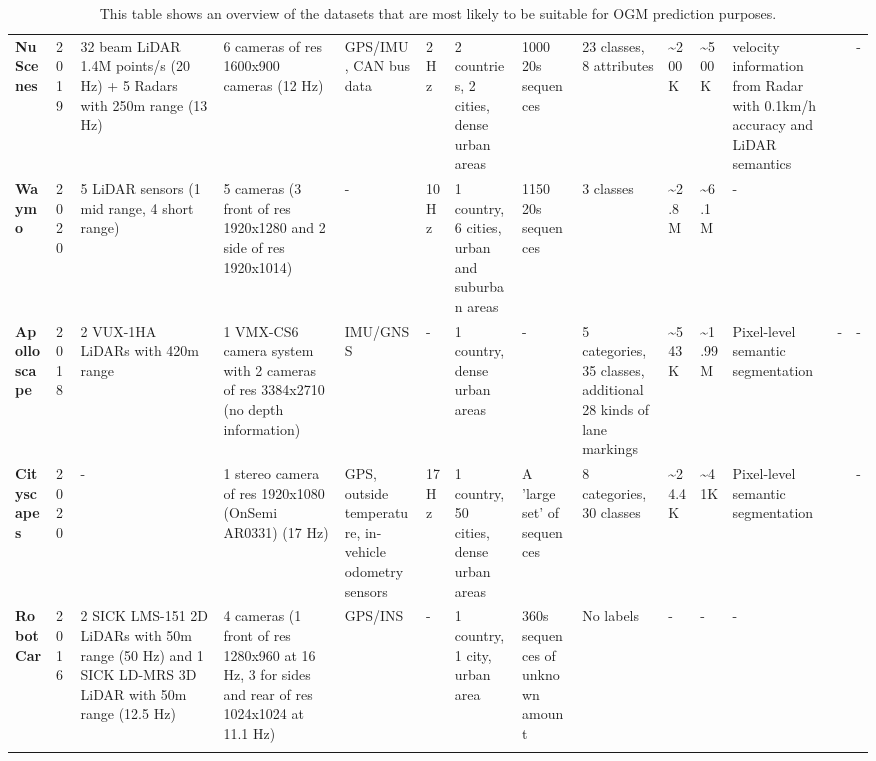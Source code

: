 {\begin{landscape}
\begin{longtable}{m{4em}m{2em}m{7em}m{7em}m{5em}m{2em}m{5em}m{7em}m{4em}m{2em}m{2em}m{5em}m{1em}m{1em}}
			\textbf{NuScenes \cite{caesar2020nuscenes}} & 2019 & 32 beam LiDAR 1.4M points/s (20 Hz) + 5 Radars with 250m range (13 Hz) & 6 cameras of res 1600x900 cameras (12 Hz) & GPS/IMU, CAN bus data & 2 Hz & 2 countries, 2 cities, dense urban areas & 1000 20s sequences & 23 classes, 8 attributes & \textasciitilde{}200K & \textasciitilde{}500K & velocity information from Radar with 0.1km/h accuracy and LiDAR semantics & \cite{roddick2020predicting} \cite{loukkal2021driving} & - \\
			\textbf{Waymo \cite{sun2020scalability}} & 2020 & 5 LiDAR sensors (1 mid range, 4 short range) & 5 cameras (3 front of res 1920x1280 and 2 side of res 1920x1014) & - & 10 Hz & 1 country, 6 cities, urban and suburban areas & 1150 20s sequences & 3 classes & \textasciitilde{}2.8M & \textasciitilde{}6.1M & - & \cite{lange2020attention} \cite{toyungyernsub2020double} & \cite{lange2020attention} \cite{toyungyernsub2020double} \\
			\textbf{Apolloscape \cite{huang2019apolloscape}} & 2018 & 2 VUX-1HA LiDARs with 420m range & 1 VMX-CS6 camera system with 2 cameras of res 3384x2710 (no depth information) & IMU/GNSS & - & 1 country, dense urban areas & - & 5 categories, 35 classes, additional 28 kinds of lane markings & \textasciitilde{}543K & \textasciitilde{}1.99M & Pixel-level semantic segmentation & - & - \\
			\textbf{Cityscapes \cite{cordts2016cityscapes}} & 2020 & - & 1 stereo camera of res 1920x1080 (OnSemi AR0331) (17 Hz) & GPS, outside temperature, in-vehicle odometry sensors & 17 Hz & 1 country, 50 cities, dense urban areas & A 'large set' of sequences & 8 categories, 30 classes & \textasciitilde{}24.4K & \textasciitilde{}41K & Pixel-level semantic segmentation & \cite{hehn2021fast} & - \\
			\textbf{RobotCar \cite{robotcardatasetijrr}} & 2016 & 2 SICK LMS-151 2D LiDARs with 50m range (50 Hz) and 1 SICK LD-MRS 3D LiDAR with 50m range (12.5 Hz) & 4 cameras (1 front of res 1280x960 at 16 Hz, 3 for sides and rear of res 1024x1024 at 11.1 Hz) & GPS/INS & - & 1 country, 1 city, urban area & 360s sequences of unknown amount & No labels & - & - & - & \cite{dequaire2018deep} \cite{wang2020l2r} & \cite{dequaire2018deep} \\
			\bottomrule
		\caption{This table shows an overview of the datasets that are most likely to be suitable for \gls{OGM} prediction purposes.}
		\label{tab:datasets_overview}	
		\end{longtable}	
	\end{landscape}
}

